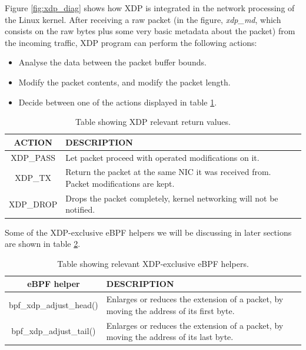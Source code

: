 \documentclass[12pt]{report} %
\begin{document}
Figure \ref{fig:xdp_diag} shows how XDP is integrated in the network processing of the Linux kernel. After receiving a raw packet (in the figure, \textit{xdp\_md}, which consists on the raw bytes plus some very basic metadata about the packet) from the incoming traffic, XDP program can perform the following actions\cite{xdp_manual}:
\begin{itemize}
\item Analyse the data between the packet buffer bounds.
\item Modify the packet contents, and modify the packet length.
\item Decide between one of the actions displayed in table \ref{table:xdp_actions_av}.
\end{itemize}

\begin{table}[H]
\begin{tabular}{|c|>{\centering\arraybackslash}p{10cm}|}
\hline
ACTION & DESCRIPTION\\
\hline
\hline
XDP\_PASS & Let packet proceed with operated modifications on it.\\
\hline
XDP\_TX & Return the packet at the same NIC it was received from. Packet modifications are kept.\\
\hline
XDP\_DROP & Drops the packet completely, kernel networking will not be notified.\\
\hline
\end{tabular}
\caption{Table showing XDP relevant return values.}
\label{table:xdp_actions_av}
\end{table}

Some of the XDP-exclusive eBPF helpers we will be discussing in later sections are shown in table \ref{table:xdp_helpers}.
\begin{table}[H]
\begin{tabular}{|c|>{\centering\arraybackslash}p{10cm}|}
\hline
eBPF helper & DESCRIPTION\\
\hline
\hline
bpf\_xdp\_adjust\_head() & Enlarges or reduces the extension of a packet, by moving the address of its first byte.\\
\hline
bpf\_xdp\_adjust\_tail() & Enlarges or reduces the extension of a packet, by moving the address of its last byte.\\
\hline
\end{tabular}
\caption{Table showing relevant XDP-exclusive eBPF helpers.}
\label{table:xdp_helpers}
\end{table}
\end{document}

